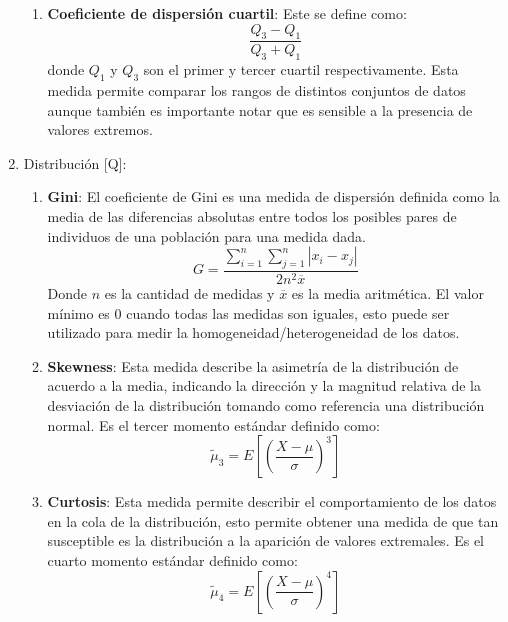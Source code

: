 \documentclass[a4paper,10pt,twocolumn]{article}
\begin{document}
\begin{enumerate}
\begin{enumerate}
						
						\item \textbf{Coeficiente de dispersi\'on cuartil}: Este se define como:
						$$\frac {Q_3 - Q_1}{Q_3 + Q_1}$$ 
						donde $Q_1$ y $Q_3$ son el primer y tercer cuartil respectivamente. Esta medida permite comparar
						los rangos de distintos conjuntos de datos aunque tambi\'en es importante notar que es sensible a la presencia de valores extremos.
						
					\end{enumerate}

				\item Distribuci\'on [Q]:
					\begin{enumerate}
						
						
						 \item \textbf{Gini}: El coeficiente de Gini es una medida de dispersi\'on definida como la media de las diferencias absolutas entre todos los
						posibles pares de individuos de una poblaci\'on para una medida dada.
						$$
							G = \frac{ \sum_{i=1}^{n} \sum_{j=1}^n {| x_i - x_j |} } {2n^2\overline{x}}
						$$
						Donde $n$ es la cantidad de medidas y $\overline{x}$ es la media aritm\'etica.
						El valor m\'inimo es 0 cuando todas las medidas son iguales, esto puede ser utilizado para medir la
						homogeneidad/heterogeneidad de los datos.
						
						\item \textbf{Skewness}: Esta medida describe la asimetr\'ia de la distribuci\'on de acuerdo a la media,
						indicando la direcci\'on y la magnitud relativa de la desviaci\'on de la distribuci\'on tomando como referencia una
						distribuci\'on normal. Es el tercer momento est\'andar definido como:
						$$
							\tilde{\mu}_3 = E \left[\left( \frac{X - \mu}{\sigma} \right)^3\right]
						$$
						
						\item \textbf{Curtosis}: Esta medida permite describir el comportamiento de los datos en la cola de la distribuci\'on, esto
						permite obtener una medida de que tan susceptible es la distribuci\'on a la aparici\'on de valores extremales. Es el cuarto momento
						est\'andar definido como:
						$$
							\tilde{\mu}_4 = E \left[\left( \frac{X - \mu}{\sigma} \right)^4\right]
						$$


\end{enumerate}
\end{enumerate}
\end{document}
